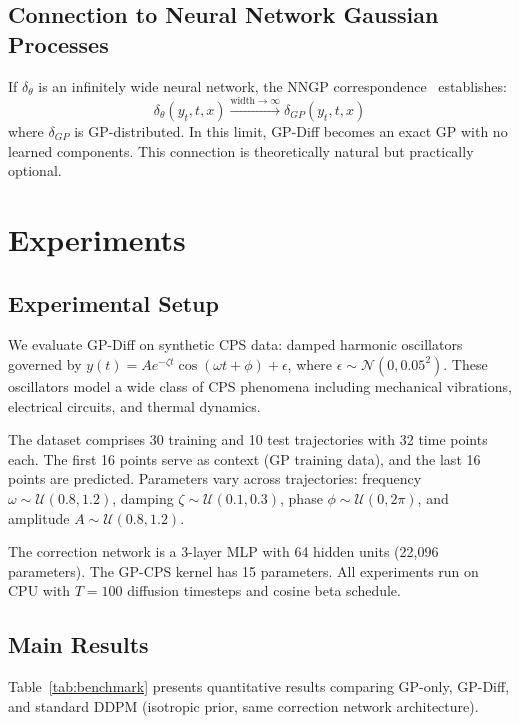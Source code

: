 \documentclass[conference]{IEEEtran}
\begin{document}
\subsection{Connection to Neural Network Gaussian Processes}

If $\delta_\theta$ is an infinitely wide neural network, the NNGP correspondence~\cite{Lee2018NNGP} establishes:
\begin{equation}
\delta_\theta(y_t, t, x) \xrightarrow{\text{width} \to \infty} \delta_{GP}(y_t, t, x)
\end{equation}
where $\delta_{GP}$ is GP-distributed. In this limit, GP-Diff becomes an exact GP with no learned components. This connection is theoretically natural but practically optional.

\section{Experiments}

\subsection{Experimental Setup}

We evaluate GP-Diff on synthetic CPS data: damped harmonic oscillators governed by $y(t) = A e^{-\zeta t} \cos(\omega t + \phi) + \epsilon$, where $\epsilon \sim \mathcal{N}(0, 0.05^2)$. These oscillators model a wide class of CPS phenomena including mechanical vibrations, electrical circuits, and thermal dynamics.

The dataset comprises 30 training and 10 test trajectories with 32 time points each. The first 16 points serve as context (GP training data), and the last 16 points are predicted. Parameters vary across trajectories: frequency $\omega \sim \mathcal{U}(0.8, 1.2)$, damping $\zeta \sim \mathcal{U}(0.1, 0.3)$, phase $\phi \sim \mathcal{U}(0, 2\pi)$, and amplitude $A \sim \mathcal{U}(0.8, 1.2)$.

The correction network is a 3-layer MLP with 64 hidden units (22,096 parameters). The GP-CPS kernel has 15 parameters. All experiments run on CPU with $T=100$ diffusion timesteps and cosine beta schedule.

\subsection{Main Results}

Table~\ref{tab:benchmark} presents quantitative results comparing GP-only, GP-Diff, and standard DDPM (isotropic prior, same correction network architecture).
\end{document}
